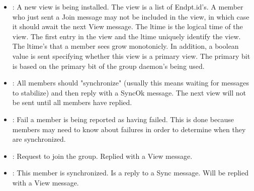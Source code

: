 \begin{itemize}
\item 

 : A new view is being installed.  The view is a
list of Endpt.id's.  A member who just sent a Join message may not be
included in the view, in which case it should await the next View
message.  The ltime is the logical time of the view.  The first entry
in the view and the ltime uniquely identify the view.  The ltime's
that a member sees grow monotonicly.  In addition, a boolean value is
sent specifying whether this view is a primary view.  The primary bit
is based on the primary bit of the group daemon's being used.
\begin{FormatTable}
\end{FormatTable}
\item 
{} : All members should "synchronize" (usually this
means waiting for messages to stabilize) and then reply with a SyncOk
message.  The next view will not be sent until all members have
replied.
\begin{FormatTable}
\end{FormatTable}
\item 
{} : Fail a member is being reported as having
failed.  This is done because members may need to know about failures
in order to determine when they are synchronized.
\begin{FormatTable}
\end{FormatTable}
\item 
{} : Request to join the group.  Replied with a
View message.
\begin{FormatTable}
\end{FormatTable}
\item 
{} : This member is synchronized.  Is a reply to a
Sync message.  Will be replied with a View message.
\begin{FormatTable}

\end{FormatTable}
\end{itemize}
